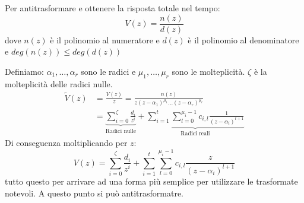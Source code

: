 \documentclass[a4paper]{article}
\begin{document}
\vspace{1em}
\noindent
Per antitrasformare e ottenere la risposta totale nel tempo:
\[
  V(z) = \frac{n(z)}{d(z)}
\] 
dove \( n(z) \) è il polinomio al numeratore e \( d(z) \) è il polinomio al denominatore e
\( deg(n(z)) \le deg(d(z)) \) 

\vspace{1em}
\noindent
Definiamo:
\( \alpha_1, \ldots, \alpha_r \) sono le radici e \( \mu_1, \ldots, \mu_r \) sono le molteplicità.
\( \zeta \) è la molteplicità delle radici nulle.
\[
  \begin{aligned}
    \tilde{V}(z) &= \frac{V(z)}{z} = \frac{n(z)}{z(z-\alpha_1)^{\mu_1} \ldots (z-\alpha_r)^{\mu_r}}\\
                 &= \underbrace{\sum_{i=0}^{\zeta} \frac{d_i}{z^i}}_{\text{Radici nulle}}
                 + \underbrace{\sum_{i=1}^{t} \sum_{l=0}^{\mu_i - 1}
                 c_{i,l} \frac{1}{(z-\alpha_i)^{l+1}}}_{\text{Radici reali}}
  \end{aligned}
\] 
Di conseguenza moltiplicando per \( z \):
\[
  V(z) = \sum_{i=0}^{\zeta} \frac{d_i}{z^i} + \sum_{i=1}^{t} \sum_{l=0}^{\mu_i - 1}
  c_{i,l} \frac{z}{(z-\alpha_i)^{l+1}}
\] 
tutto questo per arrivare ad una forma più semplice per utilizzare le trasformate
notevoli. A questo punto si può antitrasformatre.
\end{document}
